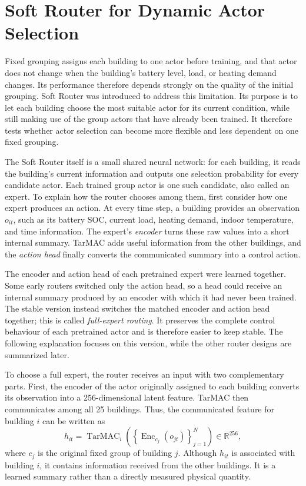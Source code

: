 \section{Soft Router for Dynamic Actor Selection}

Fixed grouping assigns each building to one actor before training, and that actor
does not change when the building's battery level, load, or heating demand
changes. Its performance therefore depends strongly on the quality of the
initial grouping. Soft Router was introduced to address this limitation. Its
purpose is to let each building choose the most suitable actor for its current
condition, while still making use of the group actors that have already been
trained. It therefore tests whether actor selection can become more flexible and
less dependent on one fixed grouping.

The Soft Router itself is a small shared neural network: for each building, it
reads the building's current information and outputs one selection probability
for every candidate actor. Each trained group actor is one such candidate, also
called an expert. To explain how the router chooses among them, first consider
how one expert produces an action. At every time step, a building provides an observation
$o_{it}$, such as its battery SOC, current load, heating demand, indoor
temperature, and time information. The expert's \emph{encoder} turns these raw
values into a short internal summary. TarMAC adds useful information from the
other buildings, and the \emph{action head} finally converts the communicated
summary into a control action.

The encoder and action head of each pretrained expert were learned together.
Some early routers switched only the action head, so a head could receive an
internal summary produced by an encoder with which it had never been trained.
The stable version instead switches the matched encoder and action head together;
this is called \emph{full-expert routing}. It preserves the complete control
behaviour of each pretrained actor and is therefore easier to keep stable. The
following explanation focuses on this version, while the other router designs
are summarized later.

To choose a full expert, the router receives an input with two complementary parts.
First, the encoder of the actor originally assigned to each building converts
its observation into a 256-dimensional latent feature. TarMAC then communicates
among all 25 buildings. Thus, the communicated feature for building $i$ can be
written as
\begin{equation}
h_{it}=\operatorname{TarMAC}_i\!\left(
\left\{\operatorname{Enc}_{c_j}(o_{jt})\right\}_{j=1}^{N}
\right)\in\mathbb{R}^{256},
\end{equation}
where $c_j$ is the original fixed group of building $j$. Although $h_{it}$ is
associated with building $i$, it contains information received from the other
buildings. It is a learned summary rather than a directly measured physical
quantity.

